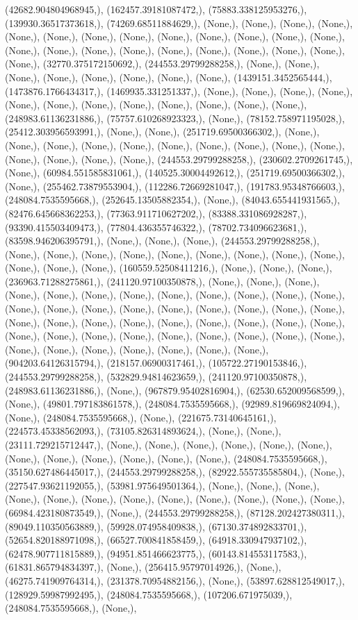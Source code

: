 \documentclass{article}
\begin{document}
(42682.904804968945,), (162457.39181087472,), (75883.338125953276,), (139930.36517373618,), (74269.68511884629,), (None,), (None,), (None,), (None,), (None,), (None,), (None,), (None,), (None,), (None,), (None,), (None,), (None,), (None,), (None,), (None,), (None,), (None,), (None,), (None,), (None,), (None,), (None,), (32770.375172150692,), (244553.29799288258,), (None,), (None,), (None,), (None,), (None,), (None,), (None,), (None,), (1439151.3452565444,), (1473876.1766434317,), (1469935.331251337,), (None,), (None,), (None,), (None,), (None,), (None,), (None,), (None,), (None,), (None,), (None,), (None,), (248983.61136231886,), (75757.610268923323,), (None,), (78152.758971195028,), (25412.303956593991,), (None,), (None,), (251719.69500366302,), (None,), (None,), (None,), (None,), (None,), (None,), (None,), (None,), (None,), (None,), (None,), (None,), (None,), (None,), (244553.29799288258,), (230602.2709261745,), (None,), (60984.551585831061,), (140525.30004492612,), (251719.69500366302,), (None,), (255462.73879553904,), (112286.72669281047,), (191783.95348766603,), (248084.7535595668,), (252645.13505882354,), (None,), (84043.655441931565,), (82476.645668362253,), (77363.911710627202,), (83388.331086928287,), (93390.415503409473,), (77804.436355746322,), (78702.734096623681,), (83598.946206395791,), (None,), (None,), (None,), (244553.29799288258,), (None,), (None,), (None,), (None,), (None,), (None,), (None,), (None,), (None,), (None,), (None,), (None,), (160559.52508411216,), (None,), (None,), (None,), (236963.71288275861,), (241120.97100350878,), (None,), (None,), (None,), (None,), (None,), (None,), (None,), (None,), (None,), (None,), (None,), (None,), (None,), (None,), (None,), (None,), (None,), (None,), (None,), (None,), (None,), (None,), (None,), (None,), (None,), (None,), (None,), (None,), (None,), (None,), (None,), (None,), (None,), (None,), (None,), (None,), (None,), (None,), (None,), (None,), (None,), (None,), (None,), (None,), (None,), (None,), (904203.64126315794,), (218157.06900317461,), (105722.27190153846,), (244553.29799288258,), (532829.94814623659,), (241120.97100350878,), (248983.61136231886,), (None,), (967879.95402816904,), (62530.652009568599,), (None,), (49801.797183861578,), (248084.7535595668,), (92989.819669824094,), (None,), (248084.7535595668,), (None,), (221675.73140645161,), (224573.45338562093,), (73105.826314893624,), (None,), (None,), (23111.729215712447,), (None,), (None,), (None,), (None,), (None,), (None,), (None,), (None,), (None,), (None,), (None,), (None,), (248084.7535595668,), (35150.627486445017,), (244553.29799288258,), (82922.555735585804,), (None,), (227547.93621192055,), (53981.975649501364,), (None,), (None,), (None,), (None,), (None,), (None,), (None,), (None,), (None,), (None,), (None,), (None,), (66984.423180873549,), (None,), (244553.29799288258,), (87128.202427380311,), (89049.110350563889,), (59928.074958409838,), (67130.374892833701,), (52654.820188971098,), (66527.700841858459,), (64918.330947937102,), (62478.907711815889,), (94951.851466623775,), (60143.814553117583,), (61831.865794834397,), (None,), (256415.95797014926,), (None,), (46275.741909764314,), (231378.70954882156,), (None,), (53897.628812549017,), (128929.59987992495,), (248084.7535595668,), (107206.671975039,), (248084.7535595668,), (None,), 
\end{document}
